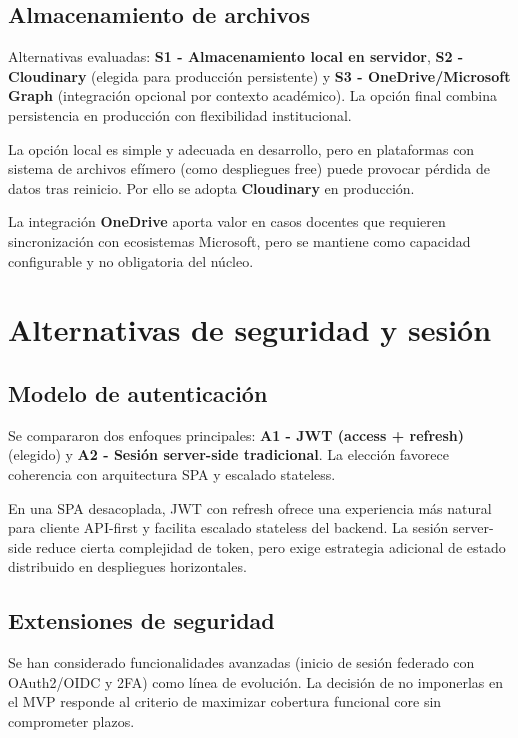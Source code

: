 \subsection{Almacenamiento de archivos}

Alternativas evaluadas: \textbf{S1 - Almacenamiento local en servidor}, \textbf{S2 - Cloudinary} (elegida para producci\'on persistente) y \textbf{S3 - OneDrive/Microsoft Graph} (integraci\'on opcional por contexto acad\'emico). La opci\'on final combina persistencia en producci\'on con flexibilidad institucional.

La opci\'on local es simple y adecuada en desarrollo,
pero en plataformas con sistema de archivos ef\'imero (como despliegues free)
puede provocar p\'erdida de datos tras reinicio.
Por ello se adopta \textbf{Cloudinary} en producci\'on.

La integraci\'on \textbf{OneDrive} aporta valor en casos docentes
que requieren sincronizaci\'on con ecosistemas Microsoft,
pero se mantiene como capacidad configurable y no obligatoria del n\'ucleo.

\FloatBarrier
\section{Alternativas de seguridad y sesi\'on}

\subsection{Modelo de autenticaci\'on}

Se compararon dos enfoques principales: \textbf{A1 - JWT (access + refresh)} (elegido) y \textbf{A2 - Sesi\'on server-side tradicional}. La elecci\'on favorece coherencia con arquitectura SPA y escalado stateless.

En una SPA desacoplada, JWT con refresh ofrece una experiencia m\'as natural
para cliente API-first y facilita escalado stateless del backend.
La sesi\'on server-side reduce cierta complejidad de token,
pero exige estrategia adicional de estado distribuido en despliegues horizontales.

\subsection{Extensiones de seguridad}

Se han considerado funcionalidades avanzadas (inicio de sesi\'on federado con OAuth2/OIDC y 2FA)
como l\'inea de evoluci\'on.
La decisi\'on de no imponerlas en el MVP responde al criterio
de maximizar cobertura funcional core sin comprometer plazos.

